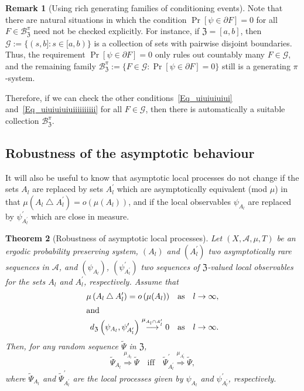 \documentclass[10pt]{amsart}
\newtheorem{theo}{Theorem}[section]
\theoremstyle{definition}\newtheorem{defi}[theo]{Definition}\newtheorem{rema}[theo]{Remark}\newtheorem{exam}[theo]{Example}\newtheorem{exem}[theo]{Example}\newtheorem{nota}[theo]{Notation}
\newcommand{\clA}{\mathcal{A}}
\newcommand{\clB}{\mathcal{B}}
\newcommand{\clG}{\mathcal{G}}
\newcommand{\frkZ}{\mathfrak{Z}}
\begin{document}
\begin{rema}[{Using rich generating families of conditioning events}]
Note that there are natural situations in which the condition $\Pr[\psi\in\partial F]=0$ for all $F\in\clB_{\frkZ}^{\pi}$ need not be checked explicitly. For instance, if $\frkZ=[a,b]$, then $\clG:=\{(s,b]:s\in\lbrack a,b)\}$ is a collection of sets with pairwise disjoint boundaries. Thus, the requirement $\Pr[\psi\in\partial F]=0$ only rules out countably many $F\in\clG$, and the remaining family $\clB_{\frkZ}^{\pi }:=\{F\in\clG:\Pr[\psi\in\partial F]=0\}$ still is a generating $\pi$-system.

Therefore, if we can check the other conditions~\eqref{Eq_uiuiuiuiui} and~\eqref{Eq_uiuiuiuiuiiiiiiiiii} for all $F\in\clG$, then there is automatically a suitable collection $\clB_{\frkZ}^{\pi}$.
\end{rema}



\subsection{Robustness of the asymptotic behaviour}
It will also be useful to know that asymptotic local processes do not change if the sets $A_{l}$ are replaced by sets $A_{l}^{\prime}$ which are asymptotically equivalent (mod $\mu$) in that $\mu(A_{l}\bigtriangleup A_{l}^{\prime})=o(\mu(A_{l}))$, and if the local observables $\psi_{A_{l}}$ are replaced by $\psi_{A_{l}^{\prime} }^{\prime}$ which are close in measure.

\begin{theo}[{Robustness of asymptotic local processes}]\label{Thm_RobustLocProc}
Let $(X,\clA,\mu,T)$ be an ergodic probability preserving system, $(A_{l})$ and $(A_{l}^{\prime})$ two asymptotically rare sequences in $\clA$, and $(\psi_{A_{l}})$, $(\psi_{A_{l}^{\prime}}^{\prime})$ two sequences of $\frkZ$-valued local observables for the sets $A_{l}$ and $A_{l}^{\prime}$, respectively. Assume that
\begin{align}
\mu\left(A_{l}\bigtriangleup A_{l}^{\prime}\right)=o\left(\mu(A_{l})\right)\quad &\text{as}\quad l\rightarrow\infty, \label{Eq_hbhbhbhbhb}
\\
\intertext{and}
d_{\frkZ}\left(\psi_{A_{l}},\psi_{A_{l}^{\prime}}^{\prime}\right)\overset {\mu_{A_{l}\cap A_{l}^{\prime}}}{\longrightarrow}0 \quad &\text{as}\quad l\rightarrow\infty. \label{Eq_LocalObsAsySameInMeasure}
\end{align}
Then, for any random sequence $\widetilde{\Psi}$  in $\frkZ$,
\begin{equation}
\widetilde{\Psi}_{A_{l}}\overset{\mu_{A_{l}}}{\Longrightarrow}\widetilde{\Psi }\quad\text{iff}\quad\widetilde{\Psi}_{A_{l}^{\prime}}^{\prime}
\overset{\mu_{A_{l}^{\prime}}}{\Longrightarrow}\widetilde{\Psi},
\end{equation}
where $\widetilde{\Psi}_{A_{l}}$ and $\widetilde{\Psi}_{A_{l}^{\prime} }^{\prime}$ are the local processes given by $\psi_{A_{l}}$ and $\psi _{A_{l}^{\prime}}^{\prime}$, respectively.
\end{theo}
\end{document}
